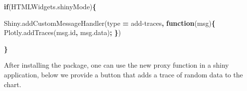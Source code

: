 \documentclass[
]{krantz}
\makeatletter
\newenvironment{Shaded}{\begin{snugshade}}{\end{snugshade}}
\newcommand{\AttributeTok}[1]{\textcolor[rgb]{0.61,0.61,0.61}{#1}}
\newcommand{\ControlFlowTok}[1]{\textcolor[rgb]{0.27,0.27,0.27}{\textbf{#1}}}
\newcommand{\KeywordTok}[1]{\textcolor[rgb]{0.27,0.27,0.27}{\textbf{#1}}}
\newcommand{\NormalTok}[1]{#1}
\newcommand{\OperatorTok}[1]{\textcolor[rgb]{0.43,0.43,0.43}{\textbf{#1}}}
\newcommand{\StringTok}[1]{\textcolor[rgb]{0.5,0.5,0.5}{#1}}
\newcommand{\VariableTok}[1]{\textcolor[rgb]{0,0,0}{#1}}
\newenvironment{kframe}{%
\medskip{}
\setlength{\fboxsep}{.8em}
 \def\at@end@of@kframe{}%
 \ifinner\ifhmode%
  \def\at@end@of@kframe{\end{minipage}}%
  \begin{minipage}{\columnwidth}%
 \fi\fi%
 \def\FrameCommand##1{\hskip\@totalleftmargin \hskip-\fboxsep
 \colorbox{shadecolor}{##1}\hskip-\fboxsep
     \hskip-\linewidth \hskip-\@totalleftmargin \hskip\columnwidth}%
 \MakeFramed {\advance\hsize-\width
   \@totalleftmargin\z@ \linewidth\hsize
   \@setminipage}}%
 {\par\unskip\endMakeFramed%
 \at@end@of@kframe}
\renewenvironment{Shaded}{\begin{kframe}}{\end{kframe}}
\makeatother
\begin{document}
\begin{Shaded}
\begin{Highlighting}[]
\ControlFlowTok{if}\NormalTok{(}\VariableTok{HTMLWidgets}\NormalTok{.}\AttributeTok{shinyMode}\NormalTok{)}\OperatorTok{\{}

  \VariableTok{Shiny}\NormalTok{.}\AttributeTok{addCustomMessageHandler}\NormalTok{(type }\OperatorTok{=} \StringTok{\textquotesingle{}add{-}traces\textquotesingle{}}\OperatorTok{,} \KeywordTok{function}\NormalTok{(msg)}\OperatorTok{\{}
    \VariableTok{Plotly}\NormalTok{.}\AttributeTok{addTraces}\NormalTok{(}\VariableTok{msg}\NormalTok{.}\AttributeTok{id}\OperatorTok{,} \VariableTok{msg}\NormalTok{.}\AttributeTok{data}\NormalTok{)}\OperatorTok{;}
  \OperatorTok{\}}\NormalTok{)}

\OperatorTok{\}}
\end{Highlighting}
\end{Shaded}

After installing the package, one can use the new proxy function in a shiny application, below we provide a button that adds a trace of random data to the chart.
\end{document}
